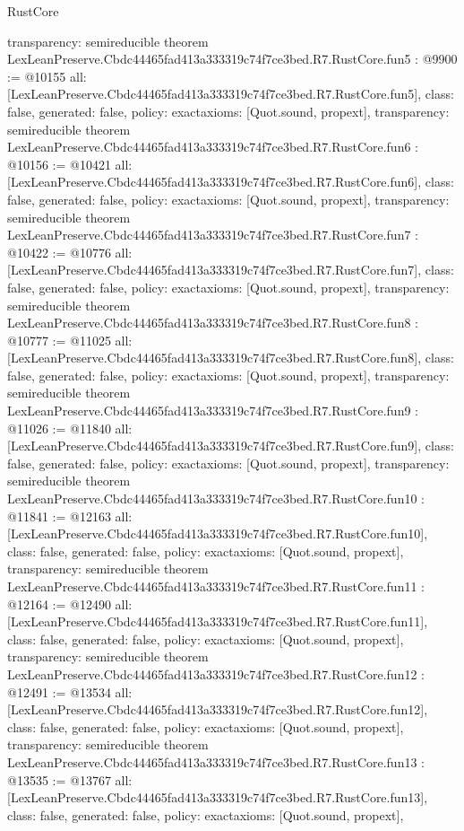 \begin{lexlean}{RustCore}
\begin{coremodule}
{  transparency: semireducible
}
theorem LexLeanPreserve.Cbdc44465fad413a333319c74f7ce3bed.R7.RustCore.fun5 : @9900 := @10155 {
  all: [LexLeanPreserve.Cbdc44465fad413a333319c74f7ce3bed.R7.RustCore.fun5],
  class: false,
  generated: false,
  policy: exact{axioms: [Quot.sound, propext]},
  transparency: semireducible
}
theorem LexLeanPreserve.Cbdc44465fad413a333319c74f7ce3bed.R7.RustCore.fun6 : @10156 := @10421 {
  all: [LexLeanPreserve.Cbdc44465fad413a333319c74f7ce3bed.R7.RustCore.fun6],
  class: false,
  generated: false,
  policy: exact{axioms: [Quot.sound, propext]},
  transparency: semireducible
}
theorem LexLeanPreserve.Cbdc44465fad413a333319c74f7ce3bed.R7.RustCore.fun7 : @10422 := @10776 {
  all: [LexLeanPreserve.Cbdc44465fad413a333319c74f7ce3bed.R7.RustCore.fun7],
  class: false,
  generated: false,
  policy: exact{axioms: [Quot.sound, propext]},
  transparency: semireducible
}
theorem LexLeanPreserve.Cbdc44465fad413a333319c74f7ce3bed.R7.RustCore.fun8 : @10777 := @11025 {
  all: [LexLeanPreserve.Cbdc44465fad413a333319c74f7ce3bed.R7.RustCore.fun8],
  class: false,
  generated: false,
  policy: exact{axioms: [Quot.sound, propext]},
  transparency: semireducible
}
theorem LexLeanPreserve.Cbdc44465fad413a333319c74f7ce3bed.R7.RustCore.fun9 : @11026 := @11840 {
  all: [LexLeanPreserve.Cbdc44465fad413a333319c74f7ce3bed.R7.RustCore.fun9],
  class: false,
  generated: false,
  policy: exact{axioms: [Quot.sound, propext]},
  transparency: semireducible
}
theorem LexLeanPreserve.Cbdc44465fad413a333319c74f7ce3bed.R7.RustCore.fun10 : @11841 := @12163 {
  all: [LexLeanPreserve.Cbdc44465fad413a333319c74f7ce3bed.R7.RustCore.fun10],
  class: false,
  generated: false,
  policy: exact{axioms: [Quot.sound, propext]},
  transparency: semireducible
}
theorem LexLeanPreserve.Cbdc44465fad413a333319c74f7ce3bed.R7.RustCore.fun11 : @12164 := @12490 {
  all: [LexLeanPreserve.Cbdc44465fad413a333319c74f7ce3bed.R7.RustCore.fun11],
  class: false,
  generated: false,
  policy: exact{axioms: [Quot.sound, propext]},
  transparency: semireducible
}
theorem LexLeanPreserve.Cbdc44465fad413a333319c74f7ce3bed.R7.RustCore.fun12 : @12491 := @13534 {
  all: [LexLeanPreserve.Cbdc44465fad413a333319c74f7ce3bed.R7.RustCore.fun12],
  class: false,
  generated: false,
  policy: exact{axioms: [Quot.sound, propext]},
  transparency: semireducible
}
theorem LexLeanPreserve.Cbdc44465fad413a333319c74f7ce3bed.R7.RustCore.fun13 : @13535 := @13767 {
  all: [LexLeanPreserve.Cbdc44465fad413a333319c74f7ce3bed.R7.RustCore.fun13],
  class: false,
  generated: false,
  policy: exact{axioms: [Quot.sound, propext]},
}
\end{coremodule}
\end{lexlean}
